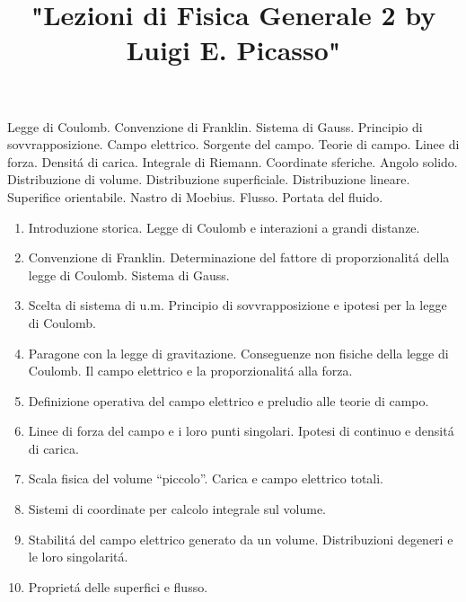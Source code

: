 

\usepackage[italian]{babel}

\title{"Lezioni di Fisica Generale 2 by Luigi E. Picasso"}


\maketitle

\begin{multicols}{3}
  Legge di Coulomb. Convenzione di Franklin. Sistema di Gauss. Principio di sovvrapposizione.
  Campo elettrico. Sorgente del campo. Teorie di campo. Linee di forza. Densit\'a di carica.
  Integrale di Riemann. Coordinate sferiche. Angolo solido. Distribuzione di volume.
  Distribuzione superficiale. Distribuzione lineare. Superifice orientabile. Nastro di Moebius. Flusso.
  Portata del fluido.
\end{multicols}

\begin{multicols}{3}
  \begin{enumerate}
  \item Introduzione storica. Legge di Coulomb e interazioni a grandi distanze.
  \item Convenzione di Franklin. Determinazione del fattore di proporzionalit\'a della legge di Coulomb.
    Sistema di Gauss.
  \item Scelta di sistema di u.m. Principio di sovvrapposizione e ipotesi per la legge di Coulomb.
  \item Paragone con la legge di gravitazione. Conseguenze non fisiche della legge di Coulomb. Il campo elettrico e la proporzionalit\'a alla forza.
  \item Definizione operativa del campo elettrico e preludio alle teorie di campo.
  \item Linee di forza del campo e i loro punti singolari. Ipotesi di continuo e densit\'a di carica.
  \item Scala fisica del volume ``piccolo''. Carica e campo elettrico totali.
  \item Sistemi di coordinate per calcolo integrale sul volume.
  \item Stabilit\'a del campo elettrico generato da un volume. Distribuzioni degeneri e le loro singolarit\'a.
  \item Propriet\'a delle superfici e flusso.
  \end{enumerate}
\end{multicols}

